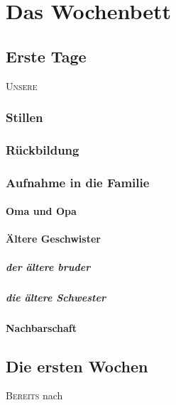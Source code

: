 \part*{Das Wochenbett}


\chapter*{Erste Tage} 
\lettrine[lines=2, loversize=0.3, lraise=0]{\initfamily U}{nsere}

\section*{Stillen}

\section*{Rückbildung}

\section*{Aufnahme in die Familie}

\subsection*{Oma und Opa}

\subsection*{Ältere Geschwister}

\subsubsection*{der ältere bruder}

\subsubsection*{die ältere Schwester}

\subsection*{Nachbarschaft}

\chapter*{Die ersten Wochen} 
\lettrine[lines=2, loversize=0.3, lraise=0]{\initfamily B}{ereits } nach
